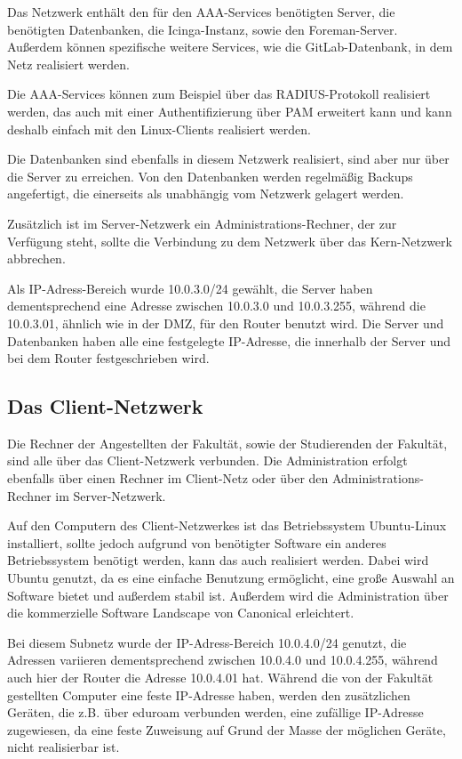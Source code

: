 Das Netzwerk enthält den für den AAA-Services benötigten Server, die benötigten Datenbanken, die Icinga-Instanz, sowie den Foreman-Server. Außerdem können spezifische weitere Services, wie die GitLab-Datenbank, in dem Netz realisiert werden.

Die AAA-Services können zum Beispiel über das RADIUS-Protokoll realisiert werden, das auch mit einer Authentifizierung über PAM erweitert kann und kann deshalb einfach mit den Linux-Clients realisiert werden.

Die Datenbanken sind ebenfalls in diesem Netzwerk realisiert, sind aber nur über die Server zu erreichen. Von den Datenbanken werden regelmäßig Backups angefertigt, die einerseits als unabhängig vom Netzwerk gelagert werden.

Zusätzlich ist im Server-Netzwerk ein Administrations-Rechner, der zur Verfügung steht, sollte die Verbindung zu dem Netzwerk über das Kern-Netzwerk abbrechen.

Als IP-Adress-Bereich wurde 10.0.3.0/24 gewählt, die Server haben dementsprechend eine Adresse zwischen 10.0.3.0 und 10.0.3.255, während die 10.0.3.01, ähnlich wie in der DMZ, für den Router benutzt wird. Die Server und Datenbanken haben alle eine festgelegte IP-Adresse, die innerhalb der Server und bei dem Router festgeschrieben wird.

\subsection{Das Client-Netzwerk}
Die Rechner der Angestellten der Fakultät, sowie der Studierenden der Fakultät, sind alle über das Client-Netzwerk verbunden. Die Administration erfolgt ebenfalls über einen Rechner im Client-Netz oder über den Administrations-Rechner im Server-Netzwerk.

Auf den Computern des Client-Netzwerkes ist das Betriebssystem Ubuntu-Linux installiert, sollte jedoch aufgrund von benötigter Software ein anderes Betriebssystem benötigt werden, kann das auch realisiert werden. Dabei wird Ubuntu genutzt, da es eine einfache Benutzung ermöglicht, eine große Auswahl an Software bietet und außerdem stabil ist. Außerdem wird die Administration über die kommerzielle Software Landscape von Canonical erleichtert.

Bei diesem Subnetz wurde der IP-Adress-Bereich 10.0.4.0/24 genutzt, die Adressen variieren dementsprechend zwischen 10.0.4.0 und 10.0.4.255, während auch hier der Router die Adresse 10.0.4.01 hat. Während die von der Fakultät gestellten Computer eine feste IP-Adresse haben, werden den zusätzlichen Geräten, die z.B. über eduroam verbunden werden, eine zufällige IP-Adresse zugewiesen, da eine feste Zuweisung auf Grund der Masse der möglichen Geräte, nicht realisierbar ist.

